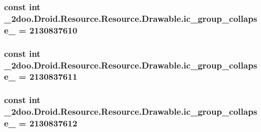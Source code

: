 \hypertarget{class__2doo_1_1_droid_1_1_resource_1_1_drawable_5e7922e8358b0aa7aef0e8da4579c745}{
\subsubsection[{ic\_\-group\_\-collapse\_\-11}]{\setlength{\rightskip}{0pt plus 5cm}const int \_\-2doo.Droid.Resource.Resource.Drawable.ic\_\-group\_\-collapse\_ = 2130837610}}
\label{class__2doo_1_1_droid_1_1_resource_1_1_drawable_5e7922e8358b0aa7aef0e8da4579c745}


\hypertarget{class__2doo_1_1_droid_1_1_resource_1_1_drawable_186f073224e3be96eb33518ab2bbed61}{
\subsubsection[{ic\_\-group\_\-collapse\_\-12}]{\setlength{\rightskip}{0pt plus 5cm}const int \_\-2doo.Droid.Resource.Resource.Drawable.ic\_\-group\_\-collapse\_ = 2130837611}}
\label{class__2doo_1_1_droid_1_1_resource_1_1_drawable_186f073224e3be96eb33518ab2bbed61}


\hypertarget{class__2doo_1_1_droid_1_1_resource_1_1_drawable_19f55b45e6187db65e066e672f23dbe2}{
\subsubsection[{ic\_\-group\_\-collapse\_\-13}]{\setlength{\rightskip}{0pt plus 5cm}const int \_\-2doo.Droid.Resource.Resource.Drawable.ic\_\-group\_\-collapse\_ = 2130837612}}
\label{class__2doo_1_1_droid_1_1_resource_1_1_drawable_19f55b45e6187db65e066e672f23dbe2}


